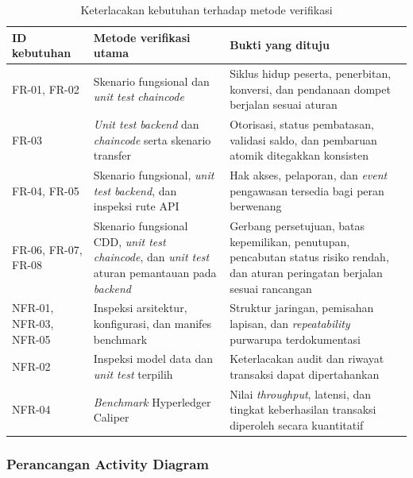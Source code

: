 \begin{table}[H]
    \caption{Keterlacakan kebutuhan terhadap metode verifikasi}
    \label{tab:srs-verifikasi}
    \centering
    \small
    \begin{tabular}{@{}p{1.8cm}p{4.7cm}p{4.8cm}@{}}
        \toprule
        \textbf{ID kebutuhan} & \textbf{Metode verifikasi utama} & \textbf{Bukti yang dituju} \\
        \midrule
        FR-01, FR-02 & Skenario fungsional dan \textit{unit test} \textit{chaincode} & Siklus hidup peserta, penerbitan, konversi, dan pendanaan dompet berjalan sesuai aturan \\
        FR-03 & \textit{Unit test} \textit{backend} dan \textit{chaincode} serta skenario transfer & Otorisasi, status pembatasan, validasi saldo, dan pembaruan atomik ditegakkan konsisten \\
        FR-04, FR-05 & Skenario fungsional, \textit{unit test} \textit{backend}, dan inspeksi rute API & Hak akses, pelaporan, dan \textit{event} pengawasan tersedia bagi peran berwenang \\
        FR-06, FR-07, FR-08 & Skenario fungsional CDD, \textit{unit test} \textit{chaincode}, dan \textit{unit test} aturan pemantauan pada \textit{backend} & Gerbang persetujuan, batas kepemilikan, penutupan, pencabutan status risiko rendah, dan aturan peringatan berjalan sesuai rancangan \\
        NFR-01, NFR-03, NFR-05 & Inspeksi arsitektur, konfigurasi, dan manifes benchmark & Struktur jaringan, pemisahan lapisan, dan \textit{repeatability} purwarupa terdokumentasi \\
        NFR-02 & Inspeksi model data dan \textit{unit test} terpilih & Keterlacakan audit dan riwayat transaksi dapat dipertahankan \\
        NFR-04 & \textit{Benchmark} Hyperledger Caliper & Nilai \textit{throughput}, latensi, dan tingkat keberhasilan transaksi diperoleh secara kuantitatif \\
        \bottomrule
    \end{tabular}
\end{table}

\subsubsection{Perancangan Activity Diagram}

